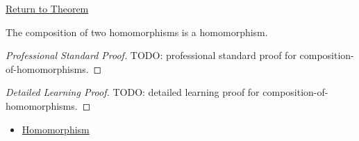 \newpage
{}
\label{prf:composition-of-homomorphisms}

\begin{remark*}[Return]
\hyperref[prop:composition-of-homomorphisms]{Return to Theorem}
\end{remark*}

\begin{proposition*}
The composition of two homomorphisms is a homomorphism.
\end{proposition*}

\begin{proof}[Professional Standard Proof]
\LRAProofBodyStart
TODO: professional standard proof for composition-of-homomorphisms.
\end{proof}

\begin{proof}[Detailed Learning Proof]
\LRAProofBodyStart
TODO: detailed learning proof for composition-of-homomorphisms.
\end{proof}

\begin{remark*}
\end{remark*}

\begin{dependencies}
\begin{itemize}
  \item \hyperref[def:homomorphism]{Homomorphism}
\end{itemize}
\end{dependencies}

\clearpage
